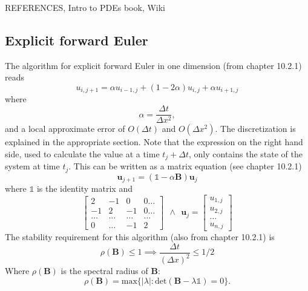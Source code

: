 \documentclass[reprint, english,notitlepage,nofootinbib]{revtex4-1}  %
\begin{document}
REFERENCES, Intro to PDEs book, Wiki


\subsection*{Explicit forward Euler}

The algorithm for explicit forward Euler in one dimension (from \cite{lectures2015} chapter 10.2.1) reads
\begin{equation}
  \label{eq:forward_euler}
	u_{i, j+1} = \alpha u_{i-1, j} + (1 - 2\alpha) u_{i,j} + \alpha u_{i+1, j}
\end{equation}
where
\begin{equation*}
	\alpha = \frac{\Delta t}{\Delta x^2},
\end{equation*}
and a local approximate error of $O(\Delta t)$ and $O(\Delta x ^2)$. The discretization is explained in the appropriate section. Note that the expression on the right hand side, used to calculate the value at a time $t_j + \Delta t$, only contains the state of the system at time $t_j$. This can be written as a matrix equation (see \cite{lectures2015} chapter 10.2.1)
\begin{equation*}
	\mathbf{u}_{j+1} = (\mathds{1} - \alpha \mathbf{B})\mathbf{u}_j
\end{equation*}
where $\mathds{1}$ is the identity matrix and
\begin{equation*}
	\begin{bmatrix}
	2 & -1 & 0 & 0\dots \\
	-1 & 2 & -1 & 0\dots\\
	\dots & \dots & \dots &\dots \\
	0 & \dots & -1 & 2
	\end{bmatrix}	 \ \ \wedge \ \ 
	\mathbf{u}_{j} = \begin{bmatrix}
	u_{1,j} \\
	u_{2,j} \\
	\ldots \\
	u_{n,j}
	\end{bmatrix}
\end{equation*}
The stability requirement for this algorithm (also from \cite{lectures2015} chapter 10.2.1) is
\begin{equation}
	\label{eq:von_neumann_stability}
	\rho(\mathbf{B}) \le 1 \implies \frac{\Delta t}{(\Delta x)^2} \le 1/2
\end{equation}
Where $\rho(\mathbf{B})$ is the spectral radius of $\mathbf{B}$:
\begin{equation*}
	\rho(\mathbf{B}) = \text{max}\{|\lambda|:\text{det}(\mathbf{B}- \lambda \mathds{1}) = 0\}.
\end{equation*}
\end{document}
